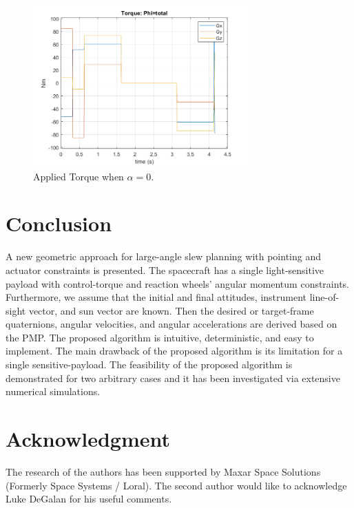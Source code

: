 \documentclass[letterpaper, preprint, paper,11pt]{AAS}	%
\begin{document}
			\begin{figure}[H]
				\label{fig:torque_total_alpha0}
				\begin{center}
					\includegraphics[width=3.25in]{figures/alpha0/torque.png}
				\end{center}
				\caption{Applied Torque when $\alpha=0$.}
			\end{figure}
			
			
	\section{Conclusion}
	 A new geometric approach for large-angle slew planning with pointing and actuator constraints is presented. The spacecraft has a single light-sensitive payload with control-torque and reaction wheels' angular momentum constraints. Furthermore, we assume that the initial and final attitudes, instrument line-of-sight vector, and sun vector are known. Then the desired or target-frame quaternions, angular velocities, and angular accelerations are derived based on the PMP.  The proposed algorithm is intuitive, deterministic, and easy to implement. The main drawback of the proposed algorithm is its limitation for a single sensitive-payload. The feasibility of the proposed algorithm is demonstrated for two arbitrary cases and it has been investigated via extensive numerical simulations.
	\section{Acknowledgment}
	The research of the authors has been supported by Maxar Space Solutions (Formerly Space Systems / Loral). The second author would like to acknowledge Luke DeGalan for his useful comments.
\end{document}
